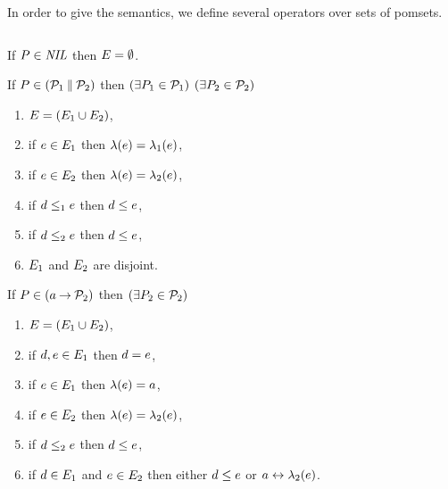 In order to give the semantics, we define several operators over sets of
pomsets.

\begin{definition} $\phantom{\;}$\par
  \label{tab:pomsets}

  \noindent
  If $\aPS\SB0\in\sNIL$ then $\aEvs\SB0 = \emptyset$.

  \noindent
  If $\aPS\SB0 \in (\aPSS_1\sPAR\aPSS_2)$ then  
  $(\exists\aPS_1\in\aPSS_1)$ $(\exists\aPS_2\in\aPSS_2)$
  \begin{enumerate}
  \item \label{par-E}
    $\aEvs\SB0 = (\aEvs_1\cup\aEvs_2)$,
  \item \label{par-lambda1}
    if $\aEv\in\aEvs_1$ then $\labeling\SB0(\aEv) = \labeling_1(\aEv)$, 
  \item \label{par-lambda2}
    if $\aEv\in\aEvs_2$ then $\labeling\SB0(\aEv) = \labeling_2(\aEv)$,
  \item \label{par-le1}
    if $\bEv\le_1\aEv$ then $\bEv\le\SB0\aEv$, 
  \item \label{par-le2}
    if $\bEv\le_2\aEv$ then $\bEv\le\SB0\aEv$, 
    \setcounter{pomsetParCount}{\value{enumi}}
  \item \label{par-disjoint}
    $\aEvs_1$ and $\aEvs_2$ are disjoint.
    \setcounter{pomsetParDisjointCount}{\value{enumi}}
  \end{enumerate}

  \noindent
  If $\aPS\SB0 \in (\aAct\sPREFIX\aPSS_2)$ then
  $(\exists\aPS_2\in\aPSS_2)$
  \begin{enumerate}
  \item \label{pre-E}
    $\aEvs\SB0=(\aEvs_1 \cup \aEvs_2)$,
  \item \label{pre-unique}
    if $\bEv,\aEv\in\aEvs_1$ then $\bEv=\aEv$,
  \item \label{pre-lambda1}
    if $\aEv\in\aEvs_1$ then $\labelingAct\SB0(\aEv) = \aAct$,
  \item \label{pre-lambda2}
    if $\aEv\in\aEvs_2$ then $\labelingAct\SB0(\aEv) = \labelingAct_2(\aEv)$,
  \item \label{pre-le2}
    if $\bEv\le_2\aEv$ then $\bEv\le\SB0\aEv$, 
  \item
    \label{pre-reorder}
    if $\bEv\in\aEvs_1$ and $\aEv\in\aEvs_2$ then either $\bEv\leq\SB0\aEv$ or $a\reorder\labeling_2(\aEv)$.
    \setcounter{pomsetPrefixOrderCount}{\value{enumi}}
  \end{enumerate}
\end{definition}
